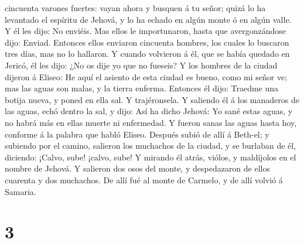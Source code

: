 cincuenta varones fuertes: vayan ahora y busquen á tu señor; quizá lo ha
levantado el espíritu de Jehová, y lo ha echado en algún monte ó en
algún valle. Y él les dijo: No enviéis.  Mas ellos le
importunaron, hasta que avergonzándose dijo: Enviad. Entonces ellos
enviaron cincuenta hombres, los cuales lo buscaron tres días, mas no lo
hallaron.  Y cuando volvieron á él, que se había quedado en
Jericó, él les dijo: ¿No os dije yo que no fueseis?  Y los
hombres de la ciudad dijeron á Eliseo: He aquí el asiento de esta ciudad
es bueno, como mi señor ve; mas las aguas son malas, y la tierra
enferma.  Entonces él dijo: Traedme una botija nueva, y
poned en ella sal. Y trajéronsela.  Y saliendo él á los
manaderos de las aguas, echó dentro la sal, y dijo: Así ha dicho Jehová:
Yo sané estas aguas, y no habrá más en ellas muerte ni enfermedad.
 Y fueron sanas las aguas hasta hoy, conforme á la palabra
que habló Eliseo.  Después subió de allí á Beth-el; y
subiendo por el camino, salieron los muchachos de la ciudad, y se
burlaban de él, diciendo: ¡Calvo, sube! ¡calvo, sube!  Y
mirando él atrás, viólos, y maldíjolos en el nombre de Jehová. Y
salieron dos osos del monte, y despedazaron de ellos cuarenta y dos
muchachos.  De allí fué al monte de Carmelo, y de allí
volvió á Samaria.

\hypertarget{section-2}{%
\section{3}\label{section-2}}

